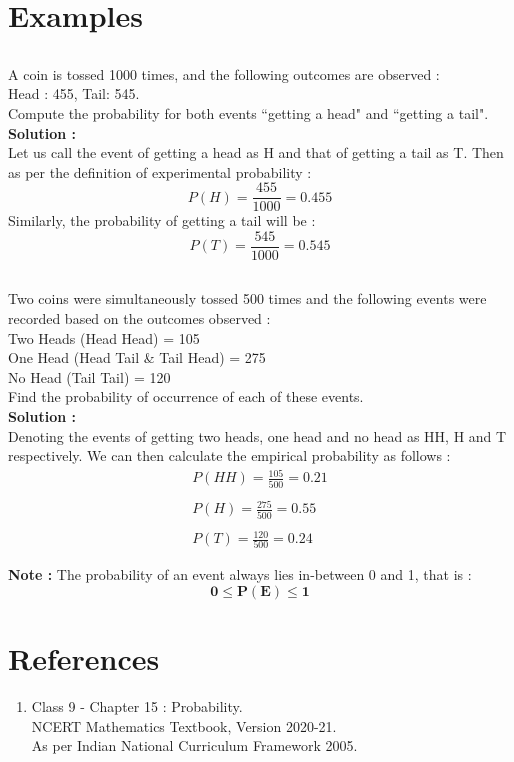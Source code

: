\documentclass[12pt, letterpaper]{article}
\begin{document}
\section{Examples}

\subsection{}
A coin is tossed 1000 times, and the following outcomes are observed :\\
Head : 455, Tail: 545.\\
Compute the probability for both events ``getting a head" and ``getting a tail".\\
\textbf{Solution :}\\
Let us call the event of getting a head as H and that of getting a tail as T. Then as per the definition of experimental probability : 
\begin{displaymath}
    P(H) = \frac{455}{1000} = 0.455
\end{displaymath}
Similarly, the probability of getting a tail will be : 
\begin{displaymath}
    P(T) = \frac{545}{1000} = 0.545
\end{displaymath}

\subsection{}
Two coins were simultaneously tossed 500 times and the following events were recorded based on the outcomes observed : \\
Two Heads (Head Head) = 105\\
One Head (Head Tail \& Tail Head) = 275\\
No Head (Tail Tail) = 120\\
Find the probability of occurrence of each of these events.\\
\textbf{Solution :}\\
Denoting the events of getting two heads, one head and no head as HH, H and T respectively. We can then calculate the empirical probability as follows : 
\begin{align*}
    P(HH) = \frac{105}{500} = 0.21 \\
    \\
    P(H) = \frac{275}{500} = 0.55 \\
    \\
    P(T) = \frac{120}{500} = 0.24
\end{align*}

\textbf{Note :} The probability of an event always lies in-between 0 and 1, that is : 
$$\mathbf{0 \leq P(E) \leq 1}$$


\section{References}
\begin{enumerate}
    \item Class 9 - Chapter 15 : Probability.\\ 
    NCERT Mathematics Textbook, Version 2020-21.\\
    As per Indian National Curriculum Framework 2005.
\end{enumerate}
\end{document}

